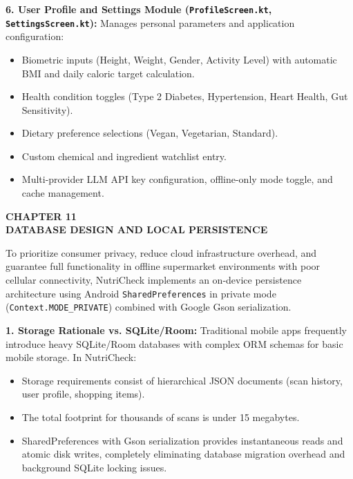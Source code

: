 \documentclass[12pt]{article}
\begin{document}
\vspace{0.3cm}

\noindent
\textbf{6. User Profile and Settings Module (\texttt{ProfileScreen.kt}, \texttt{SettingsScreen.kt}):}
Manages personal parameters and application configuration:
\begin{itemize}
    \item Biometric inputs (Height, Weight, Gender, Activity Level) with automatic BMI and daily caloric target calculation.
    \item Health condition toggles (Type 2 Diabetes, Hypertension, Heart Health, Gut Sensitivity).
    \item Dietary preference selections (Vegan, Vegetarian, Standard).
    \item Custom chemical and ingredient watchlist entry.
    \item Multi-provider LLM API key configuration, offline-only mode toggle, and cache management.
\end{itemize}

\newpage

\begin{center}
\textbf{\Large CHAPTER 11}\\[0.5cm]
\textbf{\Large DATABASE DESIGN AND LOCAL PERSISTENCE}\\[1cm]
\end{center}

\noindent
To prioritize consumer privacy, reduce cloud infrastructure overhead, and guarantee full functionality in offline supermarket environments with poor cellular connectivity, NutriCheck implements an on-device persistence architecture using Android \texttt{SharedPreferences} in private mode (\texttt{Context.MODE\_PRIVATE}) combined with Google Gson serialization.

\vspace{0.3cm}

\noindent
\textbf{1. Storage Rationale vs. SQLite/Room:}
Traditional mobile apps frequently introduce heavy SQLite/Room databases with complex ORM schemas for basic mobile storage. In NutriCheck:
\begin{itemize}
    \item Storage requirements consist of hierarchical JSON documents (scan history, user profile, shopping items).
    \item The total footprint for thousands of scans is under 15 megabytes.
    \item SharedPreferences with Gson serialization provides instantaneous reads and atomic disk writes, completely eliminating database migration overhead and background SQLite locking issues.
\end{itemize}
\end{document}
